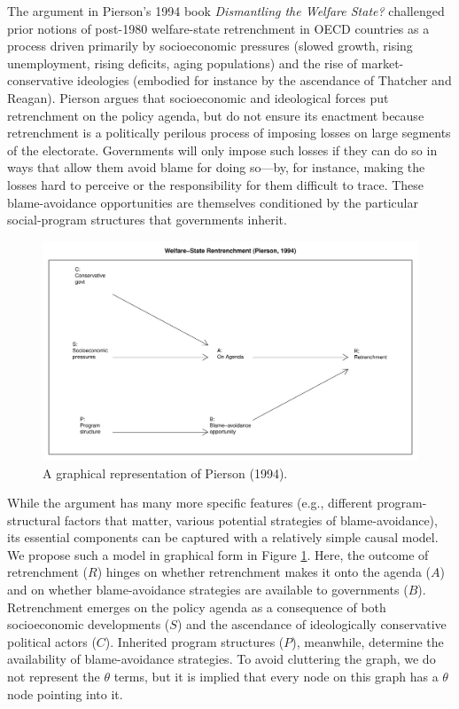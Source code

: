 \documentclass[
  12pt,
]{book}
\begin{document}
The argument in Pierson's 1994 book \emph{Dismantling the Welfare State?} challenged prior notions of post-1980 welfare-state retrenchment in OECD countries as a process driven primarily by socioeconomic pressures (slowed growth, rising unemployment, rising deficits, aging populations) and the rise of market-conservative ideologies (embodied for instance by the ascendance of Thatcher and Reagan). Pierson argues that socioeconomic and ideological forces put retrenchment on the policy agenda, but do not ensure its enactment because retrenchment is a politically perilous process of imposing losses on large segments of the electorate. Governments will only impose such losses if they can do so in ways that allow them avoid blame for doing so---by, for instance, making the losses hard to perceive or the responsibility for them difficult to trace. These blame-avoidance opportunities are themselves conditioned by the particular social-program structures that governments inherit.

\begin{figure}

{\centering \includegraphics[width=.7\textwidth]{ii_files/figure-latex/pierson-1} 

}

\caption{A graphical representation of Pierson (1994).}\label{fig:pierson}
\end{figure}

While the argument has many more specific features (e.g., different program-structural factors that matter, various potential strategies of blame-avoidance), its essential components can be captured with a relatively simple causal model. We propose such a model in graphical form in Figure \ref{fig:pierson}. Here, the outcome of retrenchment (\(R\)) hinges on whether retrenchment makes it onto the agenda (\(A\)) and on whether blame-avoidance strategies are available to governments (\(B\)). Retrenchment emerges on the policy agenda as a consequence of both socioeconomic developments (\(S\)) and the ascendance of ideologically conservative political actors (\(C\)). Inherited program structures (\(P\)), meanwhile, determine the availability of blame-avoidance strategies. To avoid cluttering the graph, we do not represent the \(\theta\) terms, but it is implied that every node on this graph has a \(\theta\) node pointing into it.
\end{document}
